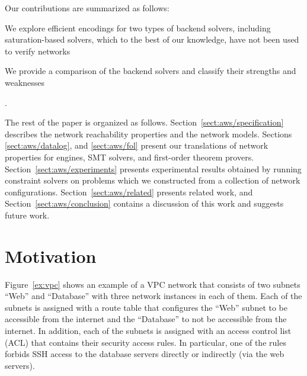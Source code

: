 Our contributions are summarized as follows: \begin{enumerate*}[label=(\roman*)]
\item We explore efficient encodings for two types of backend solvers, including 
saturation-based solvers, which to the best of our knowledge, have not been used to verify networks
\item We provide a comparison of the backend solvers and classify their strengths and weaknesses
\end{enumerate*}.

The rest of the paper is organized as follows. Section~\ref{sect:aws/specification} describes the network reachability properties and the network models. Sections \ref{sect:aws/datalog}, and \ref{sect:aws/fol} present our translations of network properties for \Datalog engines, SMT solvers, and first-order theorem provers. Section~\ref{sect:aws/experiments} presents experimental results obtained by running constraint solvers on problems which we constructed from a collection of network configurations. Section~\ref{sect:aws/related} presents related work, and Section~\ref{sect:aws/conclusion} contains a discussion of this work and suggests future work.


\section{Motivation}
\label{sect:aws/motivation}

Figure~\ref{ex:vpc} shows an example of a VPC network that consists of two subnets ``Web'' and ``Database'' with three network instances in each of them. Each of the subnets is assigned with a route table that configures the ``Web'' subnet to be accessible from the internet and the ``Database'' to not be accessible from the internet. In addition, each of the subnets is assigned with an access control list (ACL) that contains their security access rules. In particular, one of the rules forbids SSH access to the database servers directly or indirectly (via the web servers). 

